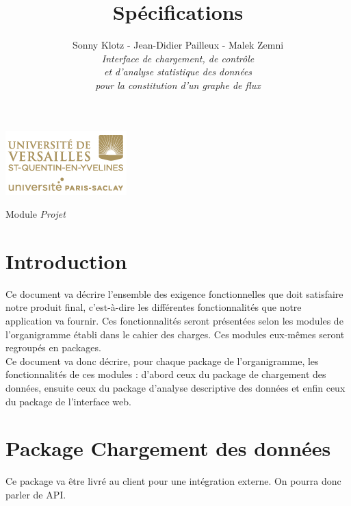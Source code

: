 

\title{\vspace{\fill}\textbf{\Huge Spécifications}}
\author{
	Sonny Klotz - Jean-Didier Pailleux - Malek Zemni
	\vspace{2em}\\
	\textit{Interface de chargement, de contrôle}\\\textit{et d’analyse statistique des données}\\\textit{pour la constitution d’un graphe de flux}
	\vspace{2em}
}


\clearpage
\maketitle\vspace{8em}
\begin{center}\includegraphics[scale=0.7]{../Cahier/logo.png}\end{center}
\begin{flushright}Module \textit{Projet}\end{flushright}
\newpage
\tableofcontents
\newpage\clearpage{}

	\section*{Introduction}
		Ce document va décrire l'ensemble des exigence fonctionnelles que doit satisfaire notre produit final, c'est-à-dire les différentes fonctionnalités que notre application va fournir. Ces fonctionnalités seront présentées selon les modules de l'organigramme établi dans le cahier des charges. Ces modules eux-mêmes seront regroupés en packages.\\
		Ce document va donc décrire, pour chaque package de l'organigramme, les fonctionnalités de ces modules : d'abord ceux du package de chargement des données, ensuite ceux du package d'analyse descriptive des données et enfin ceux du package de l'interface web.
		
	\section{Package Chargement des données}
	Ce package va être livré au client pour une intégration externe. On pourra donc parler de API.
		
